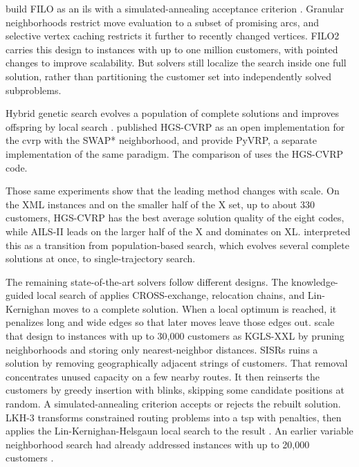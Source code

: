 \citet{accorsiFastScalableHeuristic2021} build FILO as an \gls{ils} with a simulated-annealing acceptance criterion \citep{optimization_kirkpatrick_1987}. Granular neighborhoods \citep{tothGranularTabuSearch2003} restrict move evaluation to a subset of promising arcs, and selective vertex caching restricts it further to recently changed vertices. FILO2 \citep{accorsiRoutingOneMillion2024} carries this design to instances with up to one million customers, with pointed changes to improve scalability. But solvers still localize the search inside one full solution, rather than partitioning the customer set into independently solved subproblems.

Hybrid genetic search evolves a population of complete solutions and improves offspring by local search \citep{vidalHybridGeneticAlgorithm2012}. \citet{vidalHybridGeneticSearchCVRP2022} published HGS-CVRP as an open implementation for the \gls{cvrp} with the SWAP* neighborhood, and \citet{woudaPyVRPHighPerformanceVRP2024} provide PyVRP, a separate implementation of the same paradigm. The comparison of \citet{queirogaXLInstancesCapacitated2026} uses the HGS-CVRP code.

Those same experiments show that the leading method changes with scale. On the XML instances and on the smaller half of the X set, up to about 330 customers, HGS-CVRP has the best average solution quality of the eight codes, while AILS-II leads on the larger half of the X and dominates on XL. \citet{queirogaXLInstancesCapacitated2026} interpreted this as a transition from population-based search, which evolves several complete solutions at once, to single-trajectory search.

The remaining state-of-the-art solvers follow different designs. The knowledge-guided local search of \citet{knowledgeguided_arnold_2019} applies CROSS-exchange, relocation chains, and Lin-Kernighan moves to a complete solution. When a local optimum is reached, it penalizes long and wide edges so that later moves leave those edges out. \citet{efficiently_arnold_2019} scale that design to instances with up to 30{,}000 customers as KGLS-XXL by pruning neighborhoods and storing only nearest-neighbor distances. SISRs \citep{christiaensSlackInductionString2020} ruins a solution by removing geographically adjacent strings of customers. That removal concentrates unused capacity on a few nearby routes. It then reinserts the customers by greedy insertion with blinks, skipping some candidate positions at random. A simulated-annealing criterion accepts or rejects the rebuilt solution. LKH-3 transforms constrained routing problems into a \gls{tsp} with penalties, then applies the Lin-Kernighan-Helsgaun local search to the result \citep{helsgaunExtensionLinKernighan2017}. An earlier variable neighborhood search had already addressed instances with up to 20{,}000 customers \citep{kytojokiEfficientVariableNeighborhood2007}.

